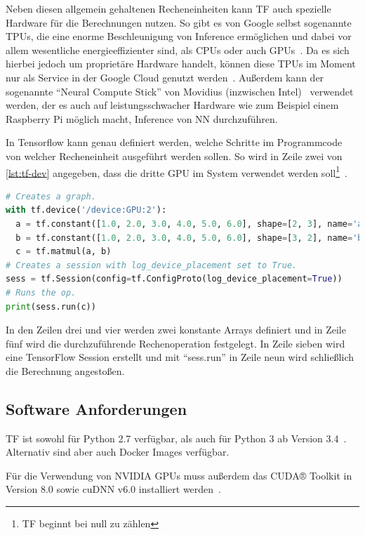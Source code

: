 Neben diesen allgemein gehaltenen Recheneinheiten kann \gls{TF} auch spezielle Hardware für die Berechnungen nutzen. So gibt es von Google selbst sogenannte \glspl{TPU}, die eine enorme Beschleunigung von Inference ermöglichen und dabei vor allem wesentliche energieeffizienter sind, als CPUs oder auch GPUs~\cite{TPU}. Da es sich hierbei jedoch um proprietäre Hardware handelt, können diese \glspl{TPU} im Moment nur als Service in der Google Cloud genutzt werden~\cite{TPU2}. Außerdem kann der sogenannte "`Neural Compute Stick"' von Movidius (inzwischen Intel)~\cite{movidius} verwendet werden, der es auch auf leistungsschwacher Hardware wie zum Beispiel einem Raspberry Pi möglich macht, Inference von \gls{NN} durchzuführen.

In Tensorflow kann genau definiert werden, welche Schritte im Programmcode von welcher Recheneinheit ausgeführt werden sollen. So wird in Zeile zwei von \autoref{lst:tf-dev} angegeben, dass die dritte GPU im System verwendet werden soll\footnote{\gls{TF} beginnt bei null zu zählen}~\cite{tf-dev}.

\begin{minipage}{\linewidth}
\begin{lstlisting}[language=Python, label=lst:tf-dev, caption={Festlegung des Geräts, auf dem die Berechnung getätigt werden soll}]
# Creates a graph.
with tf.device('/device:GPU:2'):
  a = tf.constant([1.0, 2.0, 3.0, 4.0, 5.0, 6.0], shape=[2, 3], name='a')
  b = tf.constant([1.0, 2.0, 3.0, 4.0, 5.0, 6.0], shape=[3, 2], name='b')
  c = tf.matmul(a, b)
# Creates a session with log_device_placement set to True.
sess = tf.Session(config=tf.ConfigProto(log_device_placement=True))
# Runs the op.
print(sess.run(c))
\end{lstlisting}
\end{minipage}

In den Zeilen drei und vier werden zwei konstante Arrays definiert und in Zeile fünf wird die durchzuführende Rechenoperation festgelegt. In Zeile sieben wird eine TensorFlow Session erstellt und mit "`sess.run"' in Zeile neun wird schließlich die Berechnung angestoßen.

\subsection{Software Anforderungen}
\Gls{TF} ist sowohl für Python 2.7 verfügbar, als auch für Python 3 ab Version 3.4~\cite{tfinstall}. Alternativ sind aber auch Docker Images verfügbar.

Für die Verwendung von NVIDIA GPUs muss außerdem das CUDA® Toolkit in Version 8.0 	sowie cuDNN v6.0 installiert werden~\cite{tfinstall}.

